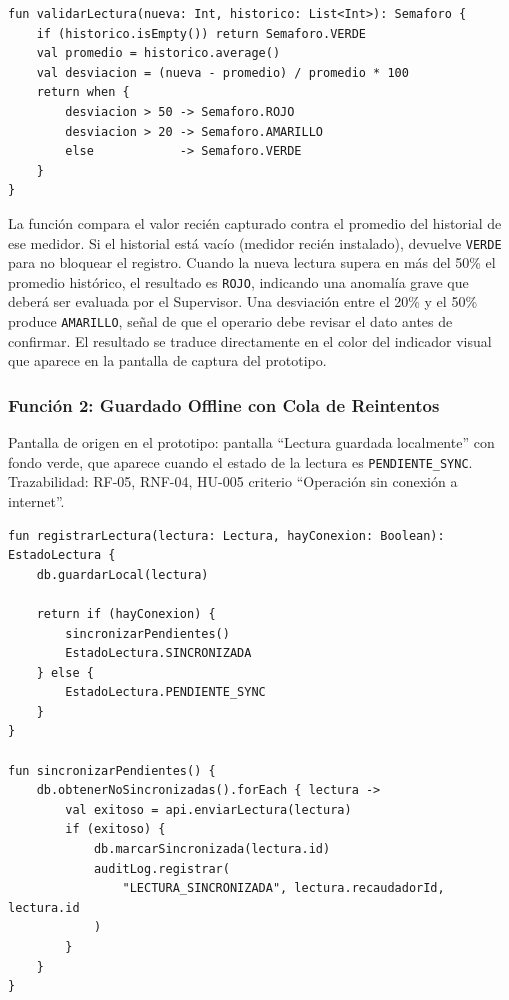 \documentclass[12pt, a4paper]{article}
\begin{document}
\begin{lstlisting}[caption={LecturaService.kt -- Función validarLectura()}]
fun validarLectura(nueva: Int, historico: List<Int>): Semaforo {
    if (historico.isEmpty()) return Semaforo.VERDE
    val promedio = historico.average()
    val desviacion = (nueva - promedio) / promedio * 100
    return when {
        desviacion > 50 -> Semaforo.ROJO
        desviacion > 20 -> Semaforo.AMARILLO
        else            -> Semaforo.VERDE
    }
}
\end{lstlisting}

\noindent La función compara el valor recién capturado contra el promedio del historial de ese medidor. Si el historial está vacío (medidor recién instalado), devuelve \texttt{VERDE} para no bloquear el registro. Cuando la nueva lectura supera en más del 50\% el promedio histórico, el resultado es \texttt{ROJO}, indicando una anomalía grave que deberá ser evaluada por el Supervisor. Una desviación entre el 20\% y el 50\% produce \texttt{AMARILLO}, señal de que el operario debe revisar el dato antes de confirmar. El resultado se traduce directamente en el color del indicador visual que aparece en la pantalla de captura del prototipo.

\clearpage
\subsubsection{Función 2: Guardado Offline con Cola de Reintentos}

\noindent Pantalla de origen en el prototipo: pantalla ``Lectura guardada localmente'' con fondo verde, que aparece cuando el estado de la lectura es \texttt{PENDIENTE\_SYNC}. Trazabilidad: RF-05, RNF-04, HU-005 criterio ``Operación sin conexión a internet''.

\begin{lstlisting}[caption={LecturaService.kt -- Funciones registrarLectura() y sincronizarPendientes()}]
fun registrarLectura(lectura: Lectura, hayConexion: Boolean): EstadoLectura {
    db.guardarLocal(lectura)

    return if (hayConexion) {
        sincronizarPendientes()
        EstadoLectura.SINCRONIZADA
    } else {
        EstadoLectura.PENDIENTE_SYNC
    }
}

fun sincronizarPendientes() {
    db.obtenerNoSincronizadas().forEach { lectura ->
        val exitoso = api.enviarLectura(lectura)
        if (exitoso) {
            db.marcarSincronizada(lectura.id)
            auditLog.registrar(
                "LECTURA_SINCRONIZADA", lectura.recaudadorId, lectura.id
            )
        }
    }
}
\end{lstlisting}
\end{document}
